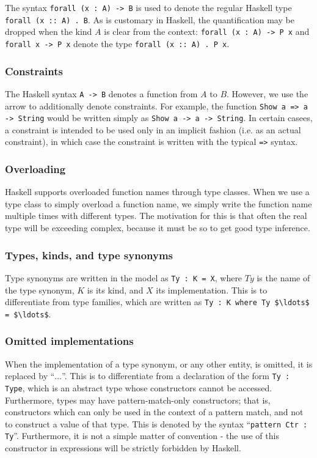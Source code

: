 \documentclass[12pt, svgnames]{article}
\let\Oldsubsubsection\subsubsection
\renewcommand{\subsubsection}{\FloatBarrier\Oldsubsubsection}
\begin{document}
The syntax \lstinline!forall (x : A) -> B! is used to denote the regular
Haskell type \texttt{forall (x :: A) . B}. As is customary in Haskell, the quantification
may be dropped when the kind $A$ is clear from the context: \lstinline!forall (x : A) -> P x! and
\lstinline!forall x -> P x! denote the type \texttt{forall (x :: A) . P x}.

\subsubsection*{Constraints}
The Haskell syntax \texttt{A -> B} denotes a function from $A$ to $B$. However,
we use the arrow to additionally denote constraints. For example, the function
\texttt{Show a => a -> String} would be written simply as \lstinline!Show a -> a -> String!.
In certain casees, a constraint is intended to be used only in an implicit fashion 
(i.e. as an actual constraint), in which case the constraint is written with 
the typical \lstinline{=>} syntax. 

\subsubsection*{Overloading}
Haskell supports overloaded function names through type classes. When we use a type 
class to simply overload a function name, we simply write the function name
multiple times with different types. The motivation for this is that often the 
real type will be exceeding complex, because it must be so to get good type inference. 

\subsubsection*{Types, kinds, and type synonyms}
Type synonyms are written in the model as \lstinline!Ty : K = X!, where $Ty$ is the name
of the type synonym, $K$ is its kind, and $X$ its implementation. This is to differentiate
from type families, which are written as \lstinline!Ty : K where Ty $\ldots$ = $\ldots$!. 

\subsubsection*{Omitted implementations}
When the implementation of a type synonym, or any other entity, is omitted, it
is replaced by ``$\ldots$''. This is to differentiate from a declaration of the form
\lstinline!Ty : Type!, which is an abstract type whose constructors cannot be
accessed. Furthermore, types may have pattern-match-only constructors; that is,
constructors which can only be used in the context of a pattern match, and not
to construct a value of that type. This is denoted by the syntax
``\lstinline!pattern Ctr : Ty!''. Furthermore, it is not a simple matter of
convention - the use of this constructor in expressions will be strictly
forbidden by Haskell.
\end{document}
